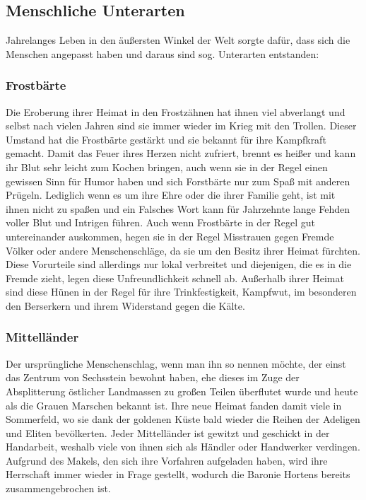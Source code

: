 \documentclass[a4paper,12pt,oneside]{book}
\begin{document}
\subsection{Menschliche Unterarten}
Jahrelanges Leben in den äußersten Winkel der Welt sorgte dafür, dass sich die Menschen angepasst haben und daraus sind sog. Unterarten entstanden:
\subsubsection{Frostbärte}
Die Eroberung ihrer Heimat in den Frostzähnen hat ihnen viel abverlangt und selbst nach vielen Jahren sind sie immer wieder im Krieg mit den Trollen. Dieser Umstand hat die Frostbärte gestärkt und sie bekannt für ihre Kampfkraft gemacht. Damit das Feuer ihres Herzen nicht zufriert, brennt es heißer und kann ihr Blut sehr leicht zum Kochen bringen, auch wenn sie in der Regel einen gewissen Sinn für Humor haben und sich Forstbärte nur zum Spaß mit anderen Prügeln. Lediglich wenn es um ihre Ehre oder die ihrer Familie geht, ist mit ihnen nicht zu spaßen und ein Falsches Wort kann für Jahrzehnte lange Fehden voller Blut und Intrigen führen. Auch wenn Frostbärte in der Regel gut untereinander auskommen, hegen sie in der Regel Misstrauen gegen Fremde Völker oder andere Menschenschläge, da sie um den Besitz ihrer Heimat fürchten. Diese Vorurteile sind allerdings nur lokal verbreitet und diejenigen, die es in die Fremde zieht, legen diese Unfreundlichkeit schnell ab. Außerhalb ihrer Heimat sind diese Hünen in der Regel für ihre Trinkfestigkeit, Kampfwut, im besonderen den Berserkern und ihrem Widerstand gegen die Kälte.
\subsubsection{Mittelländer}
Der ursprüngliche Menschenschlag, wenn man ihn so nennen möchte, der einst das Zentrum von Sechsstein bewohnt haben, ehe dieses im Zuge der Absplitterung östlicher Landmassen zu großen Teilen überflutet wurde und heute als die Grauen Marschen bekannt ist. Ihre neue Heimat fanden damit viele in Sommerfeld, wo sie dank der goldenen Küste bald wieder die Reihen der Adeligen und Eliten bevölkerten. Jeder Mittelländer ist gewitzt und geschickt in der Handarbeit, weshalb viele von ihnen sich als Händler oder Handwerker verdingen. Aufgrund des Makels, den sich ihre Vorfahren aufgeladen haben, wird ihre Herrschaft immer wieder in Frage gestellt, wodurch die Baronie Hortens bereits zusammengebrochen ist.
\end{document}
